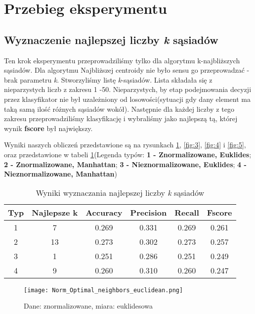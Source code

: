 \section{Przebieg eksperymentu}

	\subsection{Wyznaczenie najlepszej liczby \textit{k} sąsiadów}
		
		Ten krok eksperymentu przeprowadziliśmy tylko dla algorytmu k-najbliższych sąsiadów. Dla algorytmu Najbliższej centroidy nie było sensu go przeprowadzać - brak parametru \textit{k}.
		\bigbreak
		Stworzyliśmy listę \textit{k}-sąsiadów. Lista składała się z nieparzystych liczb z zakresu 1 -50. Nieparzystych, by etap podejmowania decyzji  przez klasyfikator nie był uzależniony od losowości(sytuacji gdy dany element ma taką samą ilość różnych sąsiadów wokół). Następnie dla każdej liczby z tego zakresu przeprowadziliśmy klasyfikację i wybraliśmy jako najlepszą tą, której wynik \textbf{fscore} był największy.
		
		Wyniki naszych obliczeń przedstawione są na rysunkach \ref{fig:2}, \ref{fig:3}, \ref{fig:4} i \ref{fig:5}, oraz przedstawione w tabeli \ref{4}(Legenda typów: \textbf{1 - Znormalizowane, Euklides}; \textbf{2 - Znormalizowane, Manhattan}; \textbf{3 - Nieznormalizowane, Euklides}; \textbf{4 - Nieznormalizowane, Manhattan})
		
		\begin{table}[h!]
			\centering
			\begin{tabular}{|| c | c | c  | c | c | c ||} 
				\hline
				Typ & Najlepsze k & Accuracy &  Precision & Recall & Fscore \\ [0.5ex] 
				\hline\hline
				1 & 7 & 0.269 & 0.331 & 0.269 & 0.261 \\ 
				2 & 13 &  0.273 & 0.302 & 0.273 & 0.257 \\
			   	3 & 1 &  0.251 & 0.286 & 0.251 & 0.249 \\
				4 & 9 &  0.260 & 0.310 & 0.260 & 0.247\\[1ex] 
				\hline
			\end{tabular}
			\caption{Wyniki wyznaczania najlepszej liczby \textit{k} sąsiadów}
			\label{4}
		\end{table}
		
		\begin{figure}[H]
			\centering
			\texttt{[image: Norm\_Optimal\_neighbors\_euclidean.png]}
			\captionsetup{justification=centering}
			\caption{Dane: znormalizowane, miara: euklidesowa}
			\label{fig:2}
		\end{figure}
		
